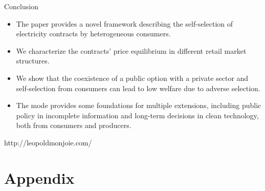 \documentclass{class}
\begin{document}
\begin{frame}{Conclusion}

\begin{itemize}
    \item The paper provides a novel framework describing the self-selection of electricity contracts by heterogeneous consumers.\vfill
    \item We characterize the contracts' price equilibrium in different retail market structures.\vfill
    \item We show that the coexistence of a public option with a private sector and self-selection from consumers can lead to low welfare due to adverse selection.\vfill
    \item The mode provides some foundations for multiple extensions, including public policy in incomplete information and long-term decisions in clean technology, both from consumers and producers.
\end{itemize}
    
\end{frame}





\begin{frame}{}
  
  \vspace{1cm}

  http://leopoldmonjoie.com/
\end{frame}


\setcounter{totalbeforeappendix}{\value{framenumber}}
\addtocounter{totalbeforeappendix}{2} 
\addtocounter{framenumber}{-19}

\section{Appendix}

\appendix
\end{document}
